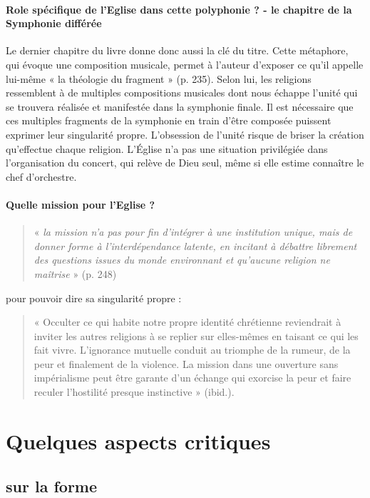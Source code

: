 \paragraph{Role spécifique de l'Eglise dans cette polyphonie ? - le chapitre de la Symphonie différée}
Le dernier chapitre du livre donne donc aussi la clé du titre. Cette métaphore, qui évoque une composition musicale, permet à l’auteur d’exposer ce qu’il appelle lui-même « la théologie du fragment » (p. 235). Selon lui, les religions ressemblent à de multiples compositions musicales dont nous échappe l’unité qui se trouvera réalisée et manifestée dans la symphonie finale. Il est nécessaire que ces multiples fragments de la symphonie en train d’être composée puissent exprimer leur singularité propre. L’obsession de l’unité risque de briser la création qu’effectue chaque religion. L’Église n’a pas une situation privilégiée dans l’organisation du concert, qui relève de Dieu seul, même si elle estime connaître le chef d’orchestre. 

\paragraph{Quelle mission pour l'Eglise ?}
\begin{quote}
    « \textit{la mission n’a pas pour fin d’intégrer à une institution unique, mais de donner forme à l’interdépendance latente, en incitant à débattre librement des questions issues du monde environnant et qu’aucune religion ne maîtrise} » (p. 248)
\end{quote} 
pour pouvoir dire sa singularité propre : 
\begin{quote}
    « Occulter ce qui habite notre propre identité chrétienne reviendrait à inviter les autres religions à se replier sur elles-mêmes en taisant ce qui les fait vivre. L’ignorance mutuelle conduit au triomphe de la rumeur, de la peur et finalement de la violence. La mission dans une ouverture sans impérialisme peut être garante d’un échange qui exorcise la peur et faire reculer l’hostilité presque instinctive » (ibid.).
\end{quote}




\section{Quelques aspects critiques} 


 \subsection{sur la forme}
 
